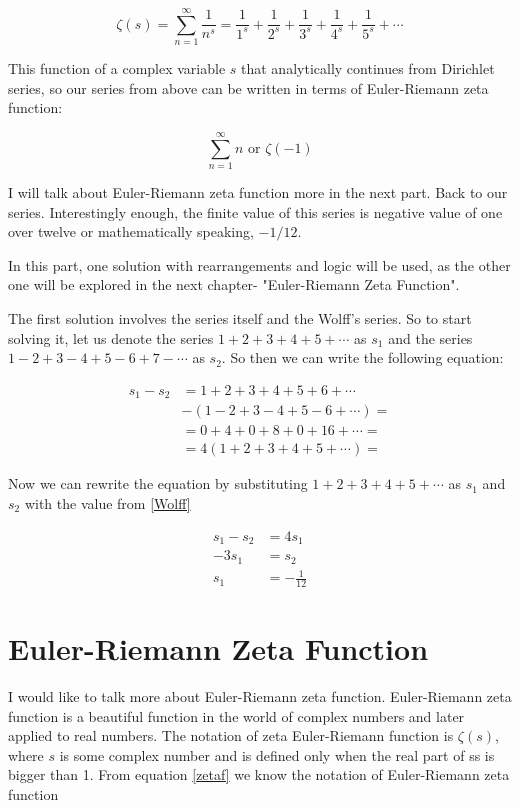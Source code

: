 \documentclass[a4paper]{article}
\begin{document}
\begin{equation}
  \zeta(s)=\sum_{n=1}^{\infty} \frac{1}{n^s}=\frac{1}{1^s}+\frac{1}{2^s}+\frac{1}{3^s}+\frac{1}{4^s}+\frac{1}{5^s}+\cdots
  \label{zetaf}
\end{equation}

This function of a complex variable \(s\) that analytically continues from
Dirichlet series, so our series from above can be written in terms of
Euler-Riemann zeta function: 

\begin{equation}
  \sum_{n=1}^{\infty} n \text{ or } \zeta(-1)
  \end{equation}

I will talk about Euler-Riemann zeta function more in the next part. Back to our
series. Interestingly enough, the finite value of this series is negative value
of one over twelve or mathematically speaking, \(-1/12\).

In this part, one solution with rearrangements and logic will be used, as the
other one will be explored in the next chapter- "Euler-Riemann Zeta
Function". 

The first solution involves the series itself and the Wolff's series. So to
start solving it, let us denote the series \(1+2+3+4+5+\cdots\) as \(s_1\) and the
series \(1-2+3-4+5-6+7-\cdots\) as \(s_2\). So then we can write the following equation: 

\begin{align*}
  s_1-s_2&=1+2+3+4+5+6+\cdots\\
  &-(1-2+3-4+5-6+\cdots)=\\
  &=0+4+0+8+0+16+\cdots=\\
  &=4(1+2+3+4+5+\cdots)=
\end{align*}

Now we can rewrite the equation by substituting \(1+2+3+4+5+\cdots\) as \(s_1\) and
\(s_2\) with the value from \ref{Wolff}

\begin{align*}
  s_1-s_2&=4s_1\\
  -3s_1&=s_2\\
  s_1&=-\frac{1}{12}
  \end{align*}

\section{Euler-Riemann Zeta Function}
\label{sec:orgecf9cd9}

I would like to talk more about Euler-Riemann zeta function. Euler-Riemann zeta
function is a beautiful function in the world of complex numbers and later
applied to real numbers. The notation of zeta Euler-Riemann function is
\(\zeta(s)\), where \(s\) is some complex number and is defined only when the real
part of ss is bigger than 1. From equation \ref{zetaf} we know the notation of
Euler-Riemann zeta function 
\end{document}
